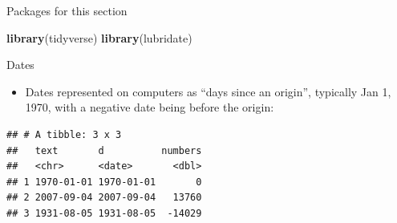 \documentclass[
  ignorenonframetext,
]{beamer}
\newenvironment{Shaded}{\begin{snugshade}}{\end{snugshade}}
\newcommand{\DataTypeTok}[1]{\textcolor[rgb]{0.13,0.29,0.53}{#1}}
\newcommand{\KeywordTok}[1]{\textcolor[rgb]{0.13,0.29,0.53}{\textbf{#1}}}
\newcommand{\NormalTok}[1]{#1}
\newcommand{\OperatorTok}[1]{\textcolor[rgb]{0.81,0.36,0.00}{\textbf{#1}}}
\newcommand{\StringTok}[1]{\textcolor[rgb]{0.31,0.60,0.02}{#1}}
\providecommand{\tightlist}{%
  \setlength{\itemsep}{0pt}\setlength{\parskip}{0pt}}
\begin{document}
\begin{frame}[fragile]{Packages for this section}
\protect\hypertarget{packages-for-this-section}{}

\begin{Shaded}
\begin{Highlighting}[]
\KeywordTok{library}\NormalTok{(tidyverse)}
\KeywordTok{library}\NormalTok{(lubridate)}
\end{Highlighting}
\end{Shaded}

\end{frame}

\begin{frame}[fragile]{Dates}
\protect\hypertarget{dates}{}

\begin{itemize}
\tightlist
\item
  Dates represented on computers as ``days since an origin'', typically
  Jan 1, 1970, with a negative date being before the origin:
\end{itemize}

\begin{Shaded}
\end{Shaded}

\begin{verbatim}
## # A tibble: 3 x 3
##   text       d          numbers
##   <chr>      <date>       <dbl>
## 1 1970-01-01 1970-01-01       0
## 2 2007-09-04 2007-09-04   13760
## 3 1931-08-05 1931-08-05  -14029
\end{verbatim}

\end{frame}
\end{document}

